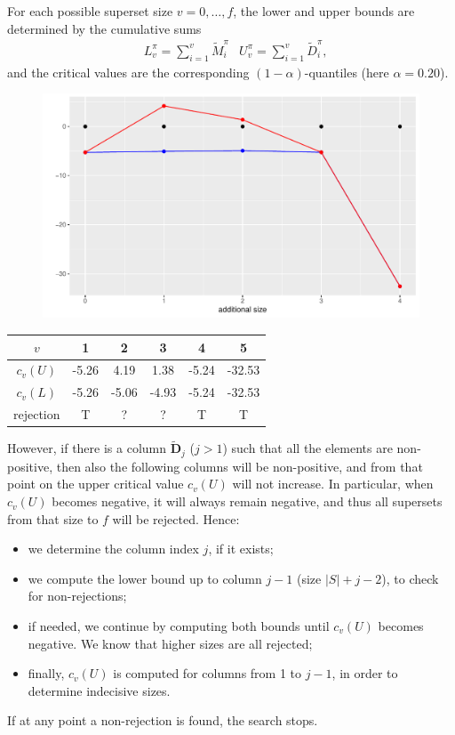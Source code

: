 \documentclass[11pt,a4paper,openright,twoside]{article}
\begin{document}
For each possible superset size $v=0,\ldots,f$, the lower and upper bounds are determined by the cumulative sums
\begin{align*}
& L_v^\pi=\sum_{i=1}^v \tilde{M}_i^\pi & U_v^\pi=\sum_{i=1}^v \tilde{D}_i^\pi,
\end{align*}
and the critical values are the corresponding $(1-\alpha)$-quantiles (here $\alpha=0.20$).

\begin{figure}[h!]
\centering
\includegraphics[scale=0.6]{plot1.pdf}
\end{figure}

\newpage


\begin{table}[h!]
\centering
\begin{tabular}{cccccc}
\toprule
$v$ & 1 & 2 & 3 & 4 & 5\\
\midrule
$c_v(U)$ & -5.26 & 4.19 & 1.38 & -5.24 & -32.53\\
$c_v(L)$ & -5.26 & -5.06 & -4.93 & -5.24 & -32.53\\
\midrule
rejection & T & ? & ? & T & T\\
\bottomrule
\end{tabular}
\end{table}

However, if there is a column $\tilde{\mathbf{D}}_j$ ($j>1$) such that all the elements are non-positive, then also the following columns will be non-positive, and from that point on the upper critical value $c_v(U)$ will not increase. In particular, when $c_v(U)$  becomes negative, it will always remain negative, and thus all supersets from that size to $f$ will be rejected. Hence:
\begin{itemize}
\item we determine the column index $j$, if it exists;
\item we compute the lower bound up to column $j-1$ (size $|S|+j-2$), to check for non-rejections;
\item if needed, we continue by computing both bounds until $c_v(U)$ becomes negative. We know that higher sizes are all rejected;
\item finally, $c_v(U)$ is computed for columns from 1 to $j-1$, in order to determine indecisive sizes.
\end{itemize}
If at any point a non-rejection is found, the search stops.
\end{document}
